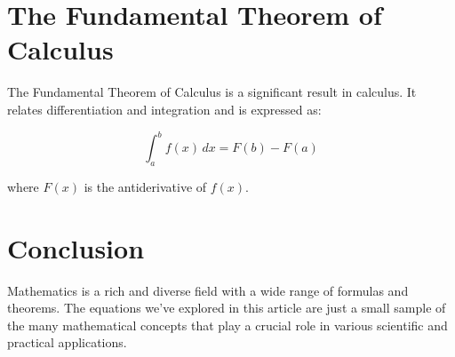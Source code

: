 \documentclass{article}
\begin{document}
\section{The Fundamental Theorem of Calculus}
The Fundamental Theorem of Calculus is a significant result in calculus. It relates differentiation and integration and is expressed as:

\begin{equation}
    \int_a^b f(x) \, dx = F(b) - F(a)
\end{equation}

where $F(x)$ is the antiderivative of $f(x)$.

\section{Conclusion}
Mathematics is a rich and diverse field with a wide range of formulas and theorems. The equations we've explored in this article are just a small sample of the many mathematical concepts that play a crucial role in various scientific and practical applications.
\end{document}

